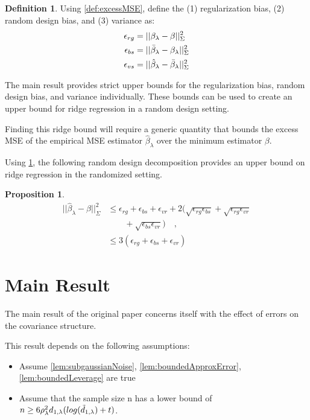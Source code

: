 \documentclass[nohyperref]{article}
\theoremstyle{plain}
\newtheorem{proposition}[theorem]{Proposition}
\theoremstyle{definition}
\newtheorem{definition}[theorem]{Definition}
\theoremstyle{remark}
\begin{document}
\begin{definition}
\label{def:biases}
Using \cref{def:excessMSE}, define the (1) regularization bias, (2) random design bias, and (3) variance as:
\begin{align}
    \epsilon_{rg} &= ||\beta_{\lambda} - \beta||^2_{\Sigma} \\
    \epsilon_{bs} &= ||\Bar{\beta}_{\lambda} - \beta_{\lambda}||^2_{\Sigma} \\
    \epsilon_{vs} &= ||\hat{\beta}_{\lambda} - \Bar{\beta}_{\lambda}||^2_{\Sigma}
\end{align}
\end{definition}

The main result provides strict upper bounds for the regularization bias, random design bias, and variance individually. These bounds can be used to create an upper bound for ridge regression in a random design setting. 

Finding this ridge bound will require a generic quantity that bounds the excess MSE of the empirical MSE estimator $\hat{\beta}_{\lambda}$ over the minimum estimator $\beta$. 

Using \cref{def:biases}, the following random design decomposition provides an upper bound on ridge regression in the randomized setting. 
\begin{proposition}
\label{prop:decomp}
\begin{align*}
    ||\hat{\beta}_{\lambda} - \beta||^2_{\Sigma} &\leq \epsilon_{rg} + \epsilon_{bs} + \epsilon_{vr} + 2(\sqrt{\epsilon_{rg}\epsilon_{bs}} + \sqrt{\epsilon_{rg}\epsilon_{vr}} \\
    &\qquad + \sqrt{\epsilon_{bs}\epsilon_{vr}})\quad,\\
    &\leq 3(\epsilon_{rg} + \epsilon_{bs} + \epsilon_{vr})
\end{align*}
\end{proposition}


\pagebreak



\section{Main Result}
The main result of the original paper concerns itself with the effect of errors on the covariance structure. 

This result depends on the following assumptions:

\begin{itemize}
    \item Assume \cref{lem:subgaussianNoise}, \cref{lem:boundedApproxError}, \cref{lem:boundedLeverage} are true
    \item Assume that the sample size n has a lower bound of $n \geq 6 \rho^2_{\lambda} d_{1, \lambda} (log(\Tilde{d}_{1,\lambda}) + t)$.
\end{itemize}
\end{document}
